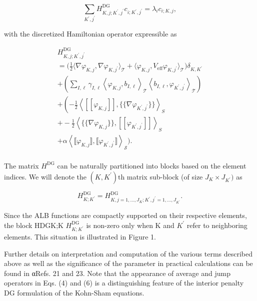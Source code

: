 \documentclass[
  10
]{article}
\begin{document}
\[
\sum_ {K ^ {\prime}, j ^ {\prime}} H _ {K, j; K ^ {\prime}, j ^ {\prime}} ^ {\mathrm{DG}} c _ {i; K ^ {\prime}, j ^ {\prime}} = \lambda_ {i} c _ {i; K, j}, \tag {5}
\]

with the discretized Hamiltonian operator expressible as

\[
\begin{array}{l} H _ {K, j; K ^ {\prime}, j ^ {\prime}} ^ {\mathrm{DG}} \\ = \Big (\frac {1}{2} \big \langle \nabla \varphi_ {K, j}, \nabla \varphi_ {K, j ^ {\prime}} \big \rangle_ {\mathcal {T}} + \big \langle \varphi_ {K, j}, V _ {\mathrm{eff}} \varphi_ {K, j ^ {\prime}} \big \rangle_ {\mathcal {T}} \Big) \delta_ {K, K ^ {\prime}} \\ \left. + \left(\sum_ {I, \ell} \gamma_ {I, \ell} \left\langle \varphi_ {K, j}, b _ {I, \ell} \right\rangle_ {\mathcal {T}} \left\langle b _ {I, \ell}, \varphi_ {K ^ {\prime}, j ^ {\prime}} \right\rangle_ {\mathcal {T}}\right) \right. \\ + \left(- \frac {1}{2} \left\langle [   [ \varphi_ {K, j} ]   ], \{\{\nabla \varphi_ {K ^ {\prime}, j ^ {\prime}} \} \} \right\rangle_ {S} \right. \\ + - \frac {1}{2} \left\langle \{\{\nabla \varphi_ {K, j} \} \}, [ [ \varphi_ {K ^ {\prime}, j ^ {\prime}} ] ] \right\rangle_ {S} \\ + \alpha \left\langle \llbracket \varphi_ {K, j} \rrbracket , \llbracket \varphi_ {K ^ {\prime}, j ^ {\prime}} \rrbracket \right\rangle_ {\mathcal {S}}). \tag {6} \\ \end{array}
\]

The matrix \(H ^ { \mathrm { D G } }\) can be naturally partitioned into
blocks based on the element indices. We will denote the
\(( K , K ^ { \prime } ) \mathrm { t h }\) matrix sub-block (of size
\(J _ { K } \times J _ { K ^ { \prime } } )\) as

\[
H _ {K; K ^ {\prime}} ^ {\mathrm{DG}} = H _ {K, j = 1, \dots , J _ {K}; K ^ {\prime}, j ^ {\prime} = 1, \dots , J _ {K ^ {\prime}}} ^ {\mathrm{DG}}. \tag {7}
\]

Since the ALB functions are compactly supported on their respective
elements, the block HDGK;K
\(H _ { K ; K ^ { \prime } } ^ { \mathrm { { D G } } }\) is non-zero
only when K and \(K ^ { \prime }\) refer to neighboring elements. This
situation is illustrated in Figure 1.

Further details on interpretation and computation of the various terms
described above as well as the significance of the parameter in
practical calculations can be found in αRefs. 21 and 23. Note that the
appearance of average and jump operators in Eqs. (4) and (6) is a
distinguishing feature of the interior penalty DG formulation of the
Kohn-Sham equations.
\end{document}
